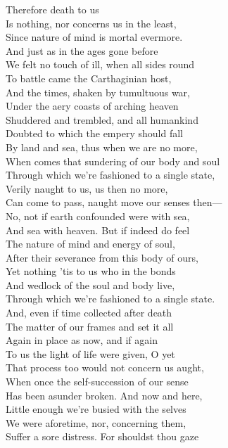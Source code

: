 Therefore death to us\\
Is nothing, nor concerns us in the least,\\
Since nature of mind is mortal evermore.\\
And just as in the ages gone before\\
We felt no touch of ill, when all sides round\\
To battle came the Carthaginian host,\\
And the times, shaken by tumultuous war,\\
Under the aery coasts of arching heaven\\
Shuddered and trembled, and all humankind\\
Doubted to which the empery should fall\\
By land and sea, thus when we are no more,\\
When comes that sundering of our body and soul\\
Through which we're fashioned to a single state,\\
Verily naught to us, us then no more,\\
Can come to pass, naught move our senses then—\\
No, not if earth confounded were with sea,\\
And sea with heaven. But if indeed do feel\\
The nature of mind and energy of soul,\\
After their severance from this body of ours,\\
Yet nothing 'tis to us who in the bonds\\
And wedlock of the soul and body live,\\
Through which we're fashioned to a single state.\\
And, even if time collected after death\\
The matter of our frames and set it all\\
Again in place as now, and if again\\
To us the light of life were given, O yet\\
That process too would not concern us aught,\\
When once the self-succession of our sense\\
Has been asunder broken. And now and here,\\
Little enough we're busied with the selves\\
We were aforetime, nor, concerning them,\\
Suffer a sore distress. For shouldst thou gaze\\
